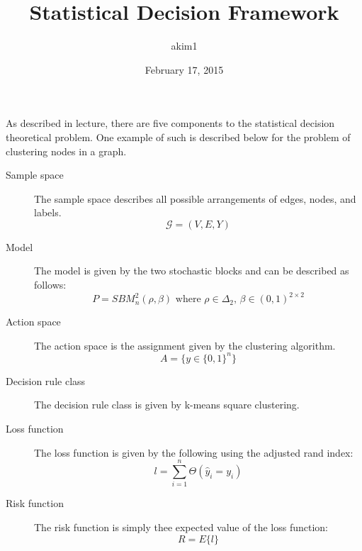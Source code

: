 \documentclass{article}
\title{Statistical Decision Framework}
\author{akim1}
\date{February 17, 2015}
\begin{document}
\maketitle

As described in lecture, there are five components to the statistical decision
theoretical problem. One example of such is described below for the problem of
clustering nodes in a graph.

\begin{description}
\item[Sample space]
The sample space describes all possible arrangements of edges, nodes, and
labels.
\begin{equation*}
\mathscr{G}=(V,E,Y)
\end{equation*}

\item[Model]
The model is given by the two stochastic blocks and can be described as follows:
\begin{equation*}
P=\mathit{SBM}_n^2(\rho,\beta)\textrm{ where }\rho\in\Delta_2\textrm{, }\beta\in(0,1)^{2\times2}
\end{equation*}

\item[Action space]
The action space is the assignment given by the clustering algorithm.
\begin{equation*}
A=\{y\in\{0,1\}^n\}
\end{equation*}

\item[Decision rule class]
The decision rule class is given by k-means square clustering.

\item[Loss function]
The loss function is given by the following using the adjusted rand index:
\begin{equation*}
l=\sum_{i=1}^n\Theta(\hat{y}_i=y_i)
\end{equation*}

\item[Risk function]
The risk function is simply thee expected value of the loss function:
\begin{equation*}
	R=E\{l\}
\end{equation*}
\end{description}
\end{document}
